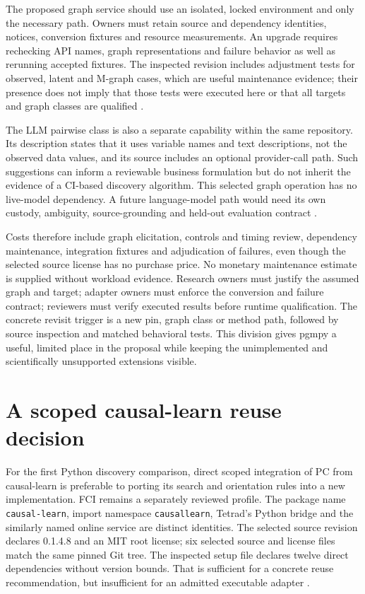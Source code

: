 The proposed graph service should use an isolated, locked environment and
only the necessary path. Owners must retain source and dependency identities,
notices, conversion fixtures and resource measurements. An upgrade requires
rechecking API names, graph representations and failure behavior as well as
rerunning accepted fixtures. The inspected revision includes adjustment
tests for observed, latent and M-graph cases, which are useful maintenance
evidence; their presence does not imply that those tests were executed here
or that all targets and graph classes are qualified
\citep{exec13_pgmpy_reuse_primary}.

The LLM pairwise class is also a separate capability within the same
repository. Its description states that it uses variable names and text
descriptions, not the observed data values, and its source includes an
optional provider-call path. Such suggestions can inform a reviewable
business formulation but do not inherit the evidence of a CI-based
discovery algorithm. This selected graph operation has no live-model
dependency. A future language-model path would need its own custody,
ambiguity, source-grounding and held-out evaluation contract
\citep{exec13_pgmpy_reuse_primary}.

Costs therefore include graph elicitation, controls and timing review,
dependency maintenance, integration fixtures and adjudication of failures,
even though the selected source license has no purchase price. No monetary
maintenance estimate is supplied without workload evidence. Research owners
must justify the assumed graph and target; adapter owners must enforce
the conversion and failure contract; reviewers must verify executed
results before runtime qualification. The concrete revisit trigger is
a new pin, graph class or method path, followed by source inspection and
matched behavioral tests. This division gives pgmpy a useful, limited
place in the proposal while keeping the unimplemented and scientifically
unsupported extensions visible.
\label{exec13:pgmpy-reuse-end}


\section{A scoped causal-learn reuse decision}
\label{exec14:causallearn-decision}

For the first Python discovery comparison, direct scoped integration of PC from
causal-learn is preferable to porting its search and orientation rules into a
new implementation. FCI remains a separately reviewed profile. The package name
\texttt{causal-learn}, import namespace \texttt{causallearn}, Tetrad's Python
bridge and the similarly named online service are distinct identities. The
selected source revision declares 0.1.4.8 and an MIT root license; six selected
source and license files match the same pinned Git tree. The inspected setup
file declares twelve direct dependencies without version bounds. That is
sufficient for a concrete reuse recommendation, but insufficient for an admitted
executable adapter \citep{exec14_causallearn_reuse}.

